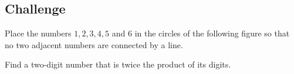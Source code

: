 \subsection{Challenge}
\begin{questions}
    \Question[2] Place the numbers \(1,2,3,4,5\) and 6 in the circles of the following figure so that no two adjacent numbers are connected by a line.
        \begin{center}
        \end{center}
    \Question[2] Find a two-digit number that is twice the product of its digits.
            \begin{solutionordottedlines}[1in]
            \end{solutionordottedlines}
\end{questions}
